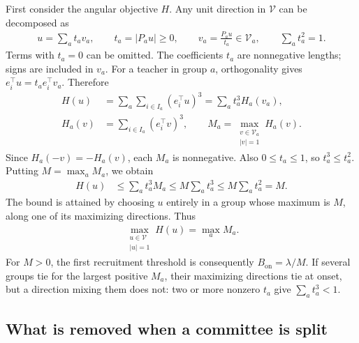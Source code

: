 \documentclass[11pt, reqno]{amsart}
\theoremstyle{notestyle}
\theoremstyle{defstyle}
\begin{document}
First consider the angular objective $H$.
Any unit direction in $\mathcal V$ can be decomposed as
\begin{align*}
    u=\sum_a t_av_a,\qquad
    t_a=|P_au|\geq0,\qquad
    v_a=\frac{P_au}{t_a}\in\mathcal V_a,\qquad
    \sum_a t_a^2=1.
\end{align*}
Terms with $t_a=0$ can be omitted.
The coefficients $t_a$ are nonnegative lengths; signs are included in $v_a$.
For a teacher in group $a$, orthogonality gives $e_i^\top u=t_ae_i^\top v_a$.
Therefore
\begin{align*}
    H(u)
    &=\sum_a\sum_{i\in I_a}(e_i^\top u)^3
      =\sum_a t_a^3H_a(v_a), \\
    H_a(v)&=\sum_{i\in I_a}(e_i^\top v)^3,
    \qquad M_a=\max_{\substack{v\in\mathcal V_a\\|v|=1}}H_a(v).
\end{align*}
Since $H_a(-v)=-H_a(v)$, each $M_a$ is nonnegative.
Also $0\leq t_a\leq1$, so $t_a^3\leq t_a^2$.
Putting $M=\max_a M_a$, we obtain
\begin{align*}
    H(u)
    &\leq\sum_a t_a^3M_a
    \leq M\sum_a t_a^3
    \leq M\sum_a t_a^2=M.
\end{align*}
The bound is attained by choosing $u$ entirely in a group whose maximum is $M$, along one of its maximizing directions.
Thus
\begin{align}\label{eq:orthogonal-H-maximum}
    \boxed{\max_{\substack{u\in\mathcal V\\|u|=1}}H(u)=\max_a M_a.}
\end{align}
For $M>0$, the first recruitment threshold is consequently $B_{\mathrm{on}}=\lambda/M$.
If several groups tie for the largest positive $M_a$, their maximizing directions tie at onset, but a direction mixing them does not: two or more nonzero $t_a$ give $\sum_a t_a^3<1$.

\subsection{What is removed when a committee is split}
\end{document}
